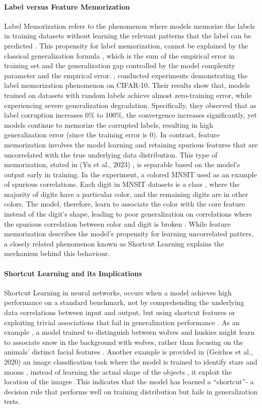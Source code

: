 \paragraph{Label versus Feature Memorization}
Label Memorization refers to the phenomenon where models memorize the labels in training datasets without learning the relevant patterns that the label can be predicted . This propensity for label memorization, cannot be explained by the classical generalization formula , which is the sum of the empirical error in training set and the generalization gap controlled by the model complexity parameter and the empirical error.  \cite{chiyuan_zhang_bd8f0549}, conducted experiments demonstrating the label memorization phenomenon on CIFAR-10. Their results show that, models trained on datasets with random labels achieve almost  zero-training error, while experiencing severe generalization degradation. Specifically, they observed that as label corruption increases 0\% to 100\%, the convergence increases significantly, yet models continue to memorize the corrupted labels, resulting in high  generalization error (since the training error is 0). 
In contrast, feature memorization involves the model learning and retaining spurious features that are uncorrelated with the true underlying data distribution.\cite{simone_bombari_23e6de9b} \cite{yang_yu_4720d432} This type of memorization, stated in (Yu et al., 2023) , is separable based on the model’s output early in training. In the experiment, a colored MNSIT used as an example of spurious correlations. Each digit in MNSIT datasets is a class , where the majority of digits have a particular color, and the remaining digits are in other colors. The model, therefore, learn to associate the color with the core feature instead of the digit’s shape, leading to poor generalization on correlations where the spurious correlation between color and digit is broken \cite{chenyu_you_e79f4b0f}.  While feature memorization describes the model’s propensity for learning uncorrelated patters, a closely related phenomenon known as Shortcut Learning explains the mechanism behind this behaviour.
\paragraph{Shortcut Learning and its Implications}
Shortcut Learning in neural networks, occurs when a model achieves high performance on a standard benchmark, not by comprehending the underlying data correlations between input and output, but using shortcut features or exploiting trivial associations that fail in generalization performance \cite{robert_geirhos_e33ec72d}.  As an example , a model trained to distinguish between wolves and huskies might learn to associate snow in the background with wolves, rather than focusing on the animals' distinct facial features \cite{chenyu_you_e79f4b0f}. Another example is provided in (Geirhos et al., 2020) an image classification task where the model is trained to identify stars and moons , instead of learning the actual shape of the  objects , it exploit the location of the images .This indicates that the model has learned a “shortcut”- a decision rule that performs well on training distribution but fails in generalization tests. 

